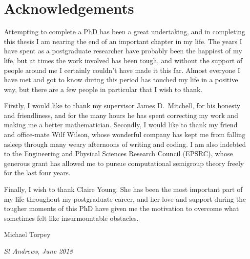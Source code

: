 \chapter*{Acknowledgements}

Attempting to complete a PhD has been a great undertaking, and in completing
this thesis I am nearing the end of an important chapter in my life.  The years
I have spent as a postgraduate researcher have probably been the happiest of my
life, but at times the work involved has been tough, and without the support of
people around me I certainly couldn't have made it this far.  Almost everyone I
have met and got to know during this period has touched my life in a positive
way, but there are a few people in particular that I wish to thank.

Firstly, I would like to thank my supervisor James D.~Mitchell, for his honesty
and friendliness, and for the many hours he has spent correcting my work and
making me a better mathematician.  Secondly, I would like to thank my friend and
office-mate Wilf Wilson, whose wonderful company has kept me from falling asleep
through many weary afternoons of writing and coding.  I am also indebted to the
Engineering and Physical Sciences Research Council (EPSRC), whose generous grant
has allowed me to pursue computational semigroup theory freely for the last four
years.

Finally, I wish to thank Claire Young.  She has been the most important part of
my life throughout my postgraduate career, and her love and support during the
tougher moments of this PhD have given me the motivation to overcome what
sometimes felt like insurmountable obstacles.

\begin{flushright}
  \singlespacing
  Michael Torpey

  \textit{St Andrews, June 2018}
\end{flushright}
